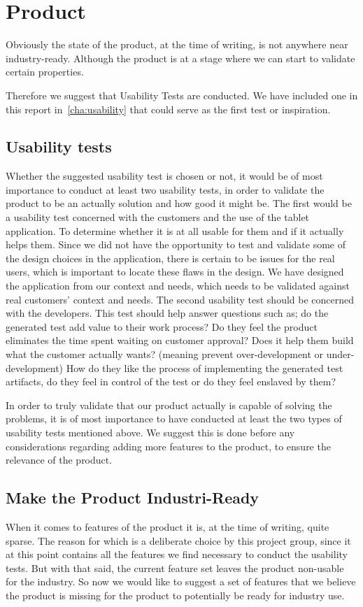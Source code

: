 \section{Product}
Obviously the state of the product, at the time of writing, is not anywhere near industry-ready.
Although the product is at a stage where we can start to validate certain properties.

Therefore we suggest that Usability Tests are conducted.
We have included one in this report in~\autoref{cha:usability} that could serve as the first test or inspiration.

\subsection{Usability tests}
Whether the suggested usability test is chosen or not, it would be of most importance to conduct at least two usability tests, in order to validate the product to be an actually solution and how good it might be.
The first would be a usability test concerned with the customers and the use of the tablet application.
To determine whether it is at all usable for them and if it actually helps them.
Since we did not have the opportunity to test and validate some of the design choices in the application, there is certain to be issues for the real users, which is important to locate these flaws in the design.
We have designed the application from our context and needs, which needs to be validated against real customers' context and needs.
The second usability test should be concerned with the developers.
This test should help answer questions such as; do the generated test add value to their work process? 
Do they feel the product eliminates the time spent waiting on customer approval?
Does it help them build what the customer actually wants? (meaning prevent over-development or under-development)
How do they like the process of implementing the generated test artifacts, do they feel in control of the test or do they feel enslaved by them?

In order to truly validate that our product actually is capable of solving the problems, it is of most importance to have conducted at least the two types of usability tests mentioned above.
We suggest this is done before any considerations regarding adding more features to the product, to ensure the relevance of the product.

\subsection{Make the Product Industri-Ready}
When it comes to features of the product it is, at the time of writing, quite sparse.
The reason for which is a deliberate choice by this project group, since it at this point contains all the features we find necessary to conduct the usability tests.
But with that said, the current feature set leaves the product non-usable for the industry.
So now we would like to suggest a set of features that we believe the product is missing for the product to potentially be ready for industry use.

